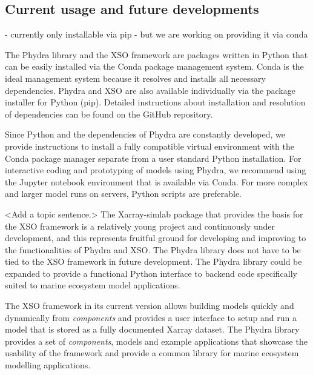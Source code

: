 \documentclass[journal abbreviation, manuscript]{copernicus}
\begin{document}




\subsection{Current usage and future developments}
- currently only installable via pip
- but we are working on providing it via conda

The Phydra library and the XSO framework are packages written in Python that can be easily installed via the Conda package management system. Conda is the ideal management system because it resolves and installs all necessary dependencies. Phydra and XSO are also available individually via the package installer for Python (pip). Detailed instructions about installation and resolution of dependencies can be found on the GitHub repository.

Since Python and the dependencies of Phydra are constantly developed, we provide instructions to install a fully compatible virtual environment with the Conda package manager separate from a user standard Python installation. For interactive coding and prototyping of models using Phydra, we recommend using the Jupyter notebook environment that is available via Conda. For more complex and larger model runs on servers, Python scripts are preferable.

<Add a topic sentence.> The Xarray-simlab package that provides the basis for the XSO framework is a relatively young project and continuously under development, and this represents fruitful ground for developing and improving to the functionalities of Phydra and XSO. The Phydra library does not have to be tied to the XSO framework in future development. The Phydra library could be expanded to provide a functional Python interface to backend code specifically suited to marine ecosystem model applications.

The XSO framework in its current version allows building models quickly and dynamically from \textit{components} and provides a user interface to setup and run a model that is stored as a fully documented Xarray dataset. The Phydra library provides a set of \textit{components}, models and example applications that showcase the usability of the framework and provide a common library for marine ecosystem modelling applications. 
\end{document}
